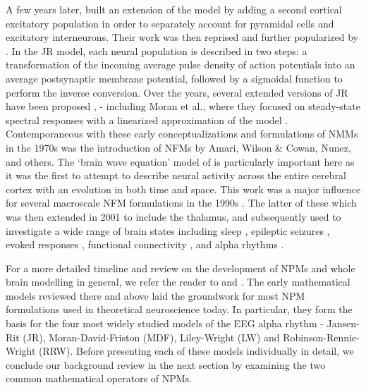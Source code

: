 \documentclass[12pt,twoside]{article}
\begin{document}
A few years later, \citet{zetterberg1978performance} %
built an extension of the model by adding a second cortical excitatory population in order to separately account for pyramidal cells and excitatory interneurons. Their work was then reprised and further popularized by \citet{jansen1995electroencephalogram}. In the JR model, each neural population is described in two steps: a transformation of the incoming average pulse density of action potentials into an average postsynaptic membrane potential, followed by a sigmoidal function to perform the inverse conversion. Over the years, several extended versions of JR have been proposed \citep{wendling2000relevance, david2003neural, zavaglia2006neural, sotero2007realistically}, - including Moran et al., where they focused on steady-state spectral responses with a linearized approximation of the model \citep{moran2007neural}. Contemporaneous with these early conceptualizations and formulations of NMMs in the 1970s was the introduction of NFMs by Amari, Wilson \& Cowan, Nunez, and others. The `brain wave equation' model of \citep{nunez1974brain} is particularly important here as it was the first to attempt to describe neural activity across the entire cerebral cortex with an evolution in both time and space. This work was a major influence for several macroscale NFM formulations in the 1990s \citep{jirsa1996field, wright1996dynamics, robinson1997propagation}. The latter of these which was then extended in 2001 to include the thalamus, and subsequently used to investigate a wide range of brain states including sleep \citep{robinson2005multiscale, abeysuriya2014prediction}, epileptic seizures \citep{zhao2015generalized, breakspear2006unifying}, evoked responses \citep{kerr2008physiology}, functional connectivity \citep{robinson2014determination}, and alpha rhythms \citep{robinson2002dynamics, robinson2005multiscale}.

For a more detailed timeline and review on the development of NPMs and whole brain modelling in general, we refer the reader to \citet{griffiths2022whole} and \citet{chow2020before}. The early mathematical models reviewed there and above laid the groundwork for most NPM formulations used in theoretical neuroscience today. In particular, they form the basis for the four most widely studied models of the EEG alpha rhythm - Jansen-Rit (JR), Moran-David-Friston (MDF), Liley-Wright (LW) and Robinson-Rennie-Wright (RRW). Before presenting each of these models individually in detail, we conclude our background review in the next section by examining the two common mathematical operators of NPMs.
\end{document}
